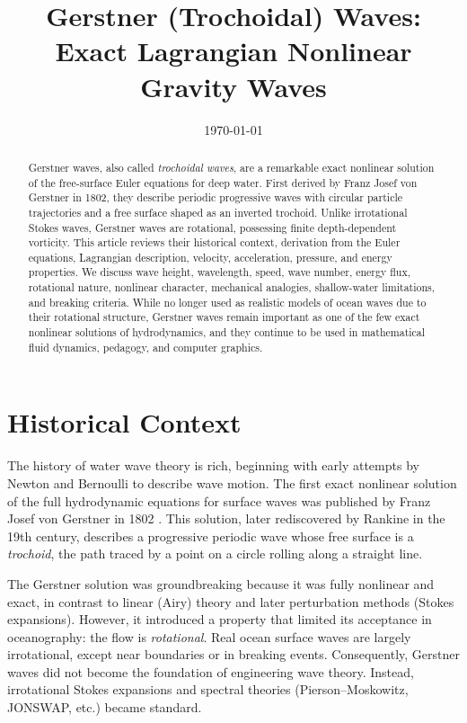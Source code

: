 \documentclass[11pt]{article}
\title{Gerstner (Trochoidal) Waves: \\
Exact Lagrangian Nonlinear Gravity Waves}
\author{}
\date{\today}
\begin{document}
\maketitle

\begin{abstract}
Gerstner waves, also called \emph{trochoidal waves}, are a remarkable exact nonlinear solution of the free-surface Euler equations for deep water. First derived by Franz Josef von Gerstner in 1802, they describe periodic progressive waves with circular particle trajectories and a free surface shaped as an inverted trochoid. Unlike irrotational Stokes waves, Gerstner waves are rotational, possessing finite depth-dependent vorticity. This article reviews their historical context, derivation from the Euler equations, Lagrangian description, velocity, acceleration, pressure, and energy properties. We discuss wave height, wavelength, speed, wave number, energy flux, rotational nature, nonlinear character, mechanical analogies, shallow-water limitations, and breaking criteria. While no longer used as realistic models of ocean waves due to their rotational structure, Gerstner waves remain important as one of the few exact nonlinear solutions of hydrodynamics, and they continue to be used in mathematical fluid dynamics, pedagogy, and computer graphics.
\end{abstract}

\tableofcontents
\bigskip

\section{Historical Context}
The history of water wave theory is rich, beginning with early attempts by Newton and Bernoulli to describe wave motion. The first exact nonlinear solution of the full hydrodynamic equations for surface waves was published by Franz Josef von Gerstner in 1802 \cite{gerstner1802}. This solution, later rediscovered by Rankine in the 19th century, describes a progressive periodic wave whose free surface is a \emph{trochoid}, the path traced by a point on a circle rolling along a straight line.

The Gerstner solution was groundbreaking because it was fully nonlinear and exact, in contrast to linear (Airy) theory and later perturbation methods (Stokes expansions). However, it introduced a property that limited its acceptance in oceanography: the flow is \emph{rotational}. Real ocean surface waves are largely irrotational, except near boundaries or in breaking events. Consequently, Gerstner waves did not become the foundation of engineering wave theory. Instead, irrotational Stokes expansions and spectral theories (Pierson–Moskowitz, JONSWAP, etc.) became standard.
\end{document}
